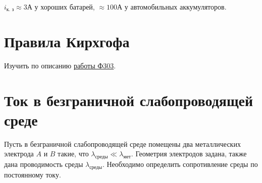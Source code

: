     \( i_{\textit{к. з}} \approx 3 \text{А} \) у хороших батарей,
    \( \approx 100 \text{А}\) у автомобильных аккумуляторов.

\section{Правила Кирхгофа}

    Изучить по описанию \href{http://google.com}{работы Ф303}.
    
\section{Ток в безграничной слабопроводящей среде}

    Пусть в безграничной слабопроводящей среде помещены два металлических
    электрода \( A \) и \( B \) такие, что \( \lambda_{\textit{среды}} \ll
    \lambda_{\textit{мет}} \).
    Геометрия электродов задана, также дана проводимость среды
    \( \lambda_{\textit{среды}} \). Необходимо определить сопротивление среды
    по постоянному току.
    
